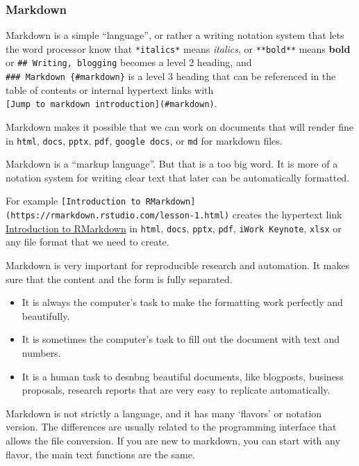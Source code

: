 \documentclass[
  fontsize=13pt,
  english,
  a4paper,
  openany, a4paper, oneside]{article}
\begin{document}
\hypertarget{markdown}{%
\subsubsection{Markdown}\label{markdown}}

Markdown is a simple ``language'', or rather a writing notation system that lets the word processor know that \texttt{*italics*} means \emph{italics}, or \texttt{**bold**} means \textbf{bold} or \texttt{\#\#\ Writing,\ blogging} becomes a level 2 heading, and \texttt{\#\#\#\ Markdown\ \{\#markdown\}} is a level 3 heading that can be referenced in the table of contents or internal hypertext links with \texttt{{[}Jump\ to\ markdown\ introduction{]}(\#markdown)}.

Markdown makes it possible that we can work on documents that will render fine in \texttt{html}, \texttt{docs}, \texttt{pptx}, \texttt{pdf}, \texttt{google\ docs}, or \texttt{md} for markdown files.

Markdown is a ``markup language''. But that is a too big word. It is more of a notation system for writing clear text that later can be automatically formatted.

For example \texttt{{[}Introduction\ to\ RMarkdown{]}(https://rmarkdown.rstudio.com/lesson-1.html)} creates the hypertext link \href{https://rmarkdown.rstudio.com/lesson-1.html}{Introduction to RMarkdown} in \texttt{html}, \texttt{docs}, \texttt{pptx}, \texttt{pdf}, \texttt{iWork\ Keynote}, \texttt{xlsx} or any file format that we need to create.

Markdown is very important for reproducible research and automation. It makes sure that the content and the form is fully separated.

\begin{itemize}
\item
  It is always the computer's task to make the formatting work perfectly and beautifully.
\item
  It is sometimes the computer's task to fill out the document with text and numbers.
\item
  It is a human task to desnbng beautiful documents, like blogposts, business proposals, research reports that are very easy to replicate automatically.
\end{itemize}

Markdown is not strictly a language, and it has many `flavors' or notation version. The differences are usually related to the programming interface that allows the file conversion. If you are new to markdown, you can start with any flavor, the main text functions are the same.
\end{document}
